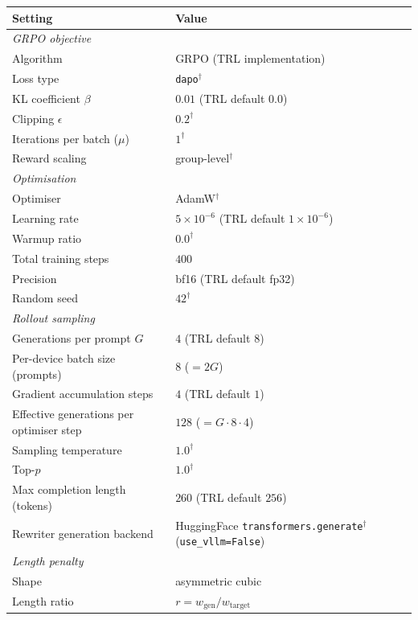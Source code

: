 \begin{table}[h]
  \centering\small
  \begin{tabular}{ll}
    \toprule
    \textbf{Setting} & \textbf{Value} \\
    \midrule
    \multicolumn{2}{l}{\emph{GRPO objective}} \\
    Algorithm & GRPO (TRL implementation) \\
    Loss type & \texttt{dapo}$^\dagger$ \\
    KL coefficient $\beta$ & $0.01$ (TRL default $0.0$) \\
    Clipping $\epsilon$ & $0.2^\dagger$ \\
    Iterations per batch ($\mu$) & $1^\dagger$ \\
    Reward scaling & group-level$^\dagger$ \\
    \midrule
    \multicolumn{2}{l}{\emph{Optimisation}} \\
    Optimiser & AdamW$^\dagger$ \\
    Learning rate & $5\times 10^{-6}$ (TRL default $1\times 10^{-6}$) \\
    Warmup ratio & $0.0^\dagger$ \\
    Total training steps & $400$ \\
    Precision & bf16 (TRL default fp32) \\
    Random seed & $42^\dagger$ \\
    \midrule
    \multicolumn{2}{l}{\emph{Rollout sampling}} \\
    Generations per prompt $G$ & $4$ (TRL default $8$) \\
    Per-device batch size (prompts) & $8$ ($= 2G$) \\
    Gradient accumulation steps & $4$ (TRL default $1$) \\
    Effective generations per optimiser step & $128$ ($= G \cdot 8 \cdot 4$) \\
    Sampling temperature & $1.0^\dagger$ \\
    Top-$p$ & $1.0^\dagger$ \\
    Max completion length (tokens) & $260$ (TRL default $256$) \\
    Rewriter generation backend & HuggingFace \texttt{transformers.generate}$^\dagger$ (\texttt{use\_vllm=False}) \\
    \midrule
    \multicolumn{2}{l}{\emph{Length penalty}} \\
    Shape & asymmetric cubic \\
    Length ratio & $r = w_\text{gen} / w_\text{target}$ \\

\end{tabular}
\end{table}
